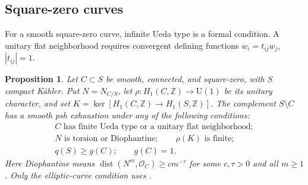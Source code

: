\documentclass[11pt]{amsart}
\newtheorem{proposition}[theorem]{Proposition}
\theoremstyle{definition}
\theoremstyle{remark}
\numberwithin{equation}{section}
\newcommand{\OO}{\mathcal O}
\newcommand{\Uone}{\mathrm U(1)}
\begin{document}
\begin{samepage}
\subsection{Square-zero curves}\label{subsec:smooth-boundary}
For a smooth square-zero curve, infinite Ueda type is a formal
condition. A unitary flat neighborhood requires convergent defining
functions $w_i=t_{ij}w_j$, $|t_{ij}|=1$.

\begin{proposition}\label{prop:surface-ueda-sufficient}
Let $C\subset S$ be smooth, connected, and square-zero, with $S$
compact K\"ahler. Put $N=N_{C/S}$, let
$\rho:H_1(C,\mathbb Z)\to\Uone$ be its unitary character, and set
$K=\ker[H_1(C,\mathbb Z)\to H_1(S,\mathbb Z)]$.
The complement $S\setminus C$ has a smooth psh exhaustion under
any of the following conditions:
\[
 \begin{gathered}
 C\text{ has finite Ueda type or a unitary flat neighborhood};\\
 N\text{ is torsion or Diophantine};\qquad \rho(K)\text{ is finite};\\
 q(S)\ge g(C);\qquad g(C)=1.
 \end{gathered}
\]
Here Diophantine means
$\operatorname{dist}(N^m,\OO_C)\ge c m^{-\tau}$ for some
$c,\tau>0$ and all $m\ge1$. Only the elliptic-curve condition uses
\cite[Theorem~1.6]{CFSTZ2026}.
\end{proposition}
\end{samepage}
\end{document}
